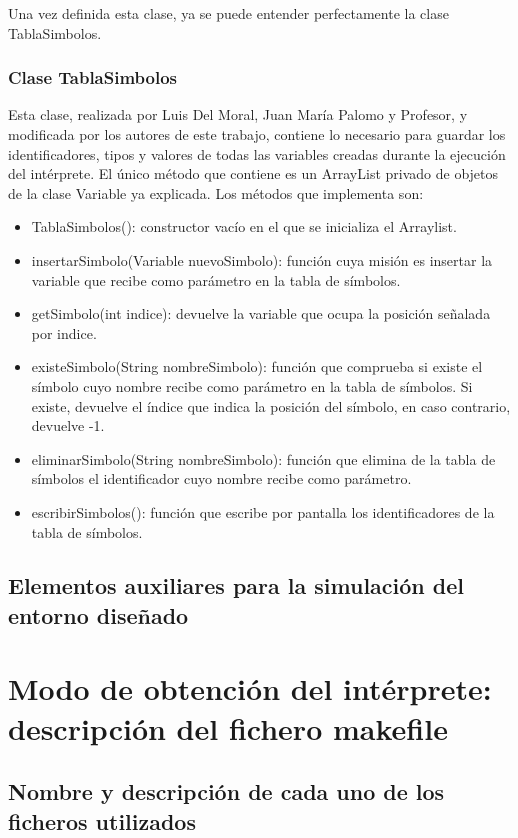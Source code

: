 \documentclass[a4paper,12pt,twoside,openright]{report}
\begin{document}
  Una vez definida esta clase, ya se puede entender perfectamente la clase TablaSimbolos.
  \subsection{Clase TablaSimbolos}
  Esta clase, realizada por Luis Del Moral, Juan María Palomo y Profesor, y modificada por los autores de este trabajo, 
  contiene lo necesario para guardar los identificadores, tipos y valores de todas las variables creadas durante la ejecución 
  del intérprete.
  El único método que contiene es un ArrayList privado de objetos de la clase Variable ya explicada.
  Los métodos que implementa son:
  \begin{itemize}
   \item TablaSimbolos(): constructor vacío en el que se inicializa el Arraylist.
   \item insertarSimbolo(Variable nuevoSimbolo): función cuya misión es insertar la variable que recibe
   como parámetro en la tabla de símbolos.
   \item getSimbolo(int indice): devuelve la variable que ocupa la posición señalada por indice.
   \item existeSimbolo(String nombreSimbolo): función que comprueba si existe el símbolo cuyo nombre recibe como 
   parámetro en la tabla de símbolos. Si existe, devuelve el índice que indica la posición del símbolo, en caso contrario, 
   devuelve -1.
   \item eliminarSimbolo(String nombreSimbolo): función que elimina de la tabla de símbolos el identificador cuyo nombre recibe como 
   parámetro.
   \item escribirSimbolos(): función que escribe por pantalla los identificadores de la tabla de símbolos.
  \end{itemize}
  
  \section{Elementos auxiliares para la simulación del entorno diseñado}

\chapter{Modo de obtención del intérprete: descripción del fichero makefile}

  \section{Nombre y descripción de cada uno de los ficheros utilizados}
  
\end{document}
